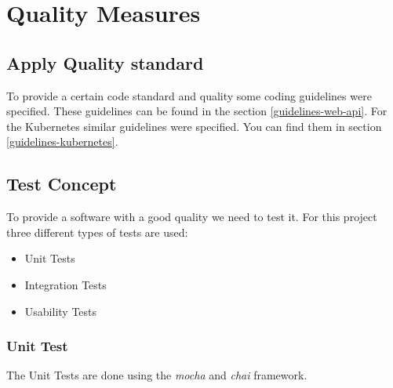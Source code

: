 \chapter{Quality Measures}

    
    


\section{Apply Quality standard}
To provide a certain code standard and quality some coding guidelines were specified.
These guidelines can be found in the section \ref{guidelines-web-api}.
For the Kubernetes similar guidelines were specified.
You can find them in section \ref{guidelines-kubernetes}.


\section{Test Concept}
To provide a software with a good quality we need to test it.
For this project three different types of tests are used:

\begin{itemize}
  \item Unit Tests
  \item Integration Tests
  \item Usability Tests
\end{itemize}

\subsection{Unit Test}
The Unit Tests are done using the \textit{mocha} and \textit{chai} framework.

